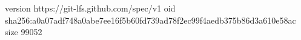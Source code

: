 version https://git-lfs.github.com/spec/v1
oid sha256:a0a07adf748a0abe7ee16f5b60fd739ad78f2ec99f4aedb375b86d3a610e58ac
size 99052
